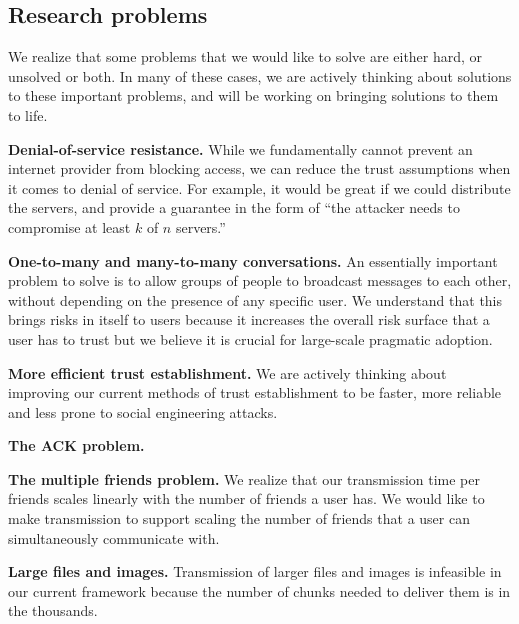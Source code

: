 \subsection{Research problems} 
We realize that some problems that we would like to solve are either hard, or unsolved or both. In many of these cases, we are actively thinking about solutions to these important problems, and will be working on bringing solutions to them to life.

\textbf{Denial-of-service resistance.} While we fundamentally cannot prevent an internet provider from blocking access, we can reduce the trust assumptions when it comes to denial of service. For example, it would be great if we could distribute the servers, and provide a guarantee in the form of ``the attacker needs to compromise at least $k$ of $n$ servers.''

\textbf{One-to-many and many-to-many conversations.} An essentially important problem to solve is to allow groups of people to broadcast messages to each other, without depending on the presence of any specific user. We understand that this brings risks in itself to users because it increases the overall risk surface that a user has to trust but we believe it is crucial for large-scale pragmatic adoption.

\textbf{More efficient trust establishment.} We are actively thinking about improving our current methods of trust establishment to be faster, more reliable and less prone to social engineering attacks.

\textbf{The ACK problem.} 

\textbf{The multiple friends problem.} We realize that our transmission time per friends scales linearly with the number of friends a user has. We would like to make transmission to support scaling the number of friends that a user can simultaneously communicate with.

\textbf{Large files and images.} Transmission of larger files and images is infeasible in our current framework because the number of chunks needed to deliver them is in the thousands.
